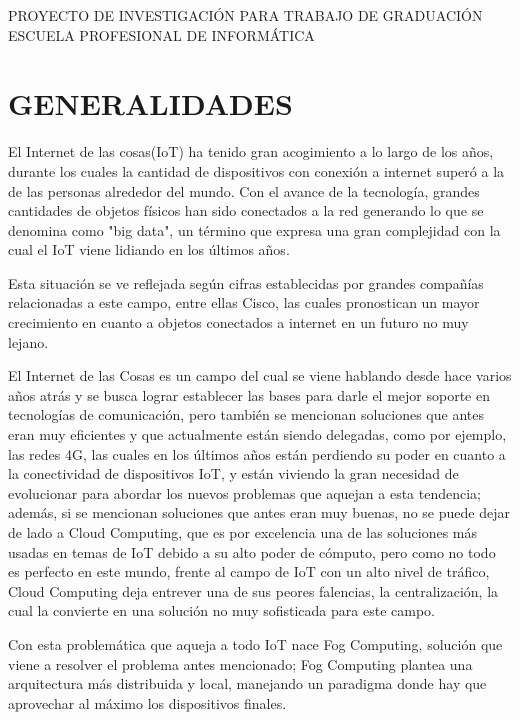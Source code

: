 \begin{center}
    \Large {PROYECTO DE INVESTIGACIÓN PARA TRABAJO DE GRADUACIÓN \\
    \vskip 0.2cm
     ESCUELA PROFESIONAL DE INFORMÁTICA}
\end{center}
\vskip 1cm

\section{GENERALIDADES}
El Internet de las cosas(IoT) ha tenido gran acogimiento a lo largo de los años, durante los cuales la cantidad de dispositivos con conexión a internet superó a la de las personas alrededor del mundo. Con el avance de la tecnología, grandes cantidades de objetos físicos han sido conectados a la red generando lo que se denomina como "big data", un término que expresa una gran complejidad con la cual el IoT viene lidiando en los últimos años.\par
\vskip 0.3cm
Esta situación se ve reflejada según cifras establecidas por grandes compañías relacionadas a este campo, entre ellas Cisco, las cuales pronostican un mayor crecimiento en cuanto a objetos conectados a internet en un futuro no muy lejano.\par
\vskip 0.3cm
El Internet de las Cosas es un campo del cual se viene hablando desde hace varios años atrás y se busca lograr establecer las bases para darle el mejor soporte en tecnologías de comunicación, pero también se mencionan soluciones que antes eran muy eficientes y que actualmente están siendo delegadas, como por ejemplo, las redes 4G, las cuales en los últimos años están perdiendo su poder en cuanto a la conectividad de dispositivos IoT, y están viviendo la gran necesidad de evolucionar para abordar los nuevos problemas que aquejan a esta tendencia; además, si se mencionan soluciones que antes eran muy buenas, no se puede dejar de lado a Cloud Computing, que es por excelencia una de las soluciones más usadas en temas de IoT debido a su alto poder de cómputo, pero como no todo es perfecto en este mundo, frente al campo de IoT con un alto nivel de tráfico, Cloud Computing deja entrever una de sus peores falencias, la centralización, la cual la convierte en una solución no muy sofisticada para este campo.\par
\vskip 0.3cm
Con esta problemática que aqueja a todo IoT nace Fog Computing, solución que viene a resolver el problema antes mencionado; Fog Computing plantea una arquitectura más distribuida y local, manejando un paradigma donde hay que aprovechar al máximo los dispositivos finales.\par
